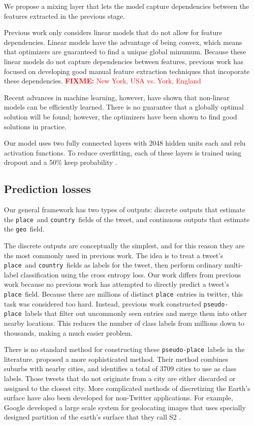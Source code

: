 \documentclass{article}
\newcommand{\fixme}[1]{\textcolor{red}{\textbf{FIXME:} {#1}}}
\newcommand{\tweetdata}[1]{{\texttt{#1}~}}
\newcommand{\place        }{\tweetdata{place}}
\newcommand{\pseudoplace  }{\tweetdata{pseudo-place}}
\newcommand{\country      }{\tweetdata{country}}
\newcommand{\geo          }{\tweetdata{geo}}
\begin{document}
We propose a mixing layer that lets the model capture dependencies between the features extracted in the previous stage.

Previous work only considers linear models that do not allow for feature dependencies.
Linear models have the advantage of being convex,
which means that optimizers are guaranteed to find a unique global minumum.
Because these linear models do not capture dependencies between features,
previous work has focused on developing good manual feature extraction techniques that incoporate these dependencies.
\fixme{New York, USA vs. York, England}

Recent advances in machine learning, however, have shown that non-linear models can be efficiently learned.
There is no guarantee that a globally optimal solution will be found;
however, the optimizers have been shown to find good solutions in practice.

Our model uses two fully connected layers with 2048 hidden units each and relu activation functions.
To reduce overfitting, each of these layers is trained using dropout and a 50\% keep probability \citep{}.

\subsection{Prediction losses}

Our general framework has two types of outputs:
discrete outputs that estimate the \place and \country fields of the tweet,
and continuous outputs that estimate the \geo field.

The discrete outputs are conceptually the simplest,
and for this reason they are the most commonly used in previous work.
The idea is to treat a tweet's \place and \country fields as labels for the tweet,
then perform ordinary multi-label classification using the cross entropy loss.
Our work differs from previous work because no previous work has attempted to directly predict a tweet's \place field.
Because there are millions of distinct \place entries in twitter,
this task was considered too hard.
Instead, previous work constructed \pseudoplace labels that filter out uncommonly seen entries and merge them into other nearby locations.
This reduces the number of class labels from millions down to thousands,
making a much easier problem.

There is no standard method for constructing these \pseudoplace labels in the literature.
\citet{han2012geolocation} proposed a more sophisticated method.
Their method combines suburbs with nearby cities,
and identifies a total of 3709 cities to use as class labels.
Those tweets that do not originate from a city are either discarded or assigned to the closest city.
More complicated methods of discretizing the Earth's surface have also been developed for non-Twitter applications.
For example, Google developed a large scale system for geolocating images that uses specially designed partition of the earth's surface that they call S2 \citep{weyand2016planet}.
\end{document}
